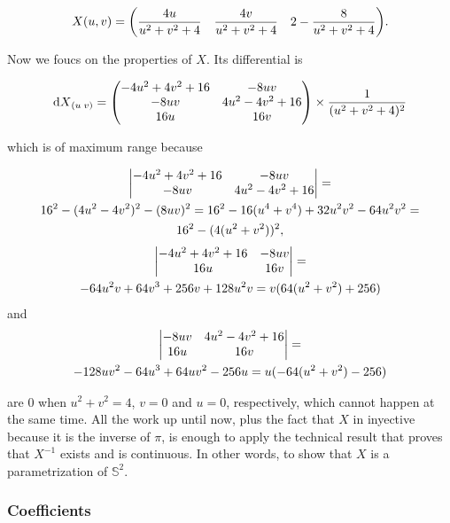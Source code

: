 \documentclass[
    12pt, %
]{fphw}
\newcommand{\sphere}{{\mathbb{S}^2}}
\begin{document}
\begin{equation*}
    X(u, v) =
    \mqty(\dfrac{4u}{u^2+v^2+4} & \dfrac{4v}{u^2+v^2+4} & 2-\dfrac{8}{u^2+v^2+4}).
\end{equation*}

    Now we foucs on the properties of $X$. Its differential is

\begin{equation*}
    \dd{X}_{(u \; v)} =
    \pmqty{
    -4u^2 + 4v^2 + 16 & -8uv \\
    -8uv & 4u^2 - 4v^2 + 16 \\
    16u & 16v \\
    } \times \frac{1}{(u^2+v^2+4)^2}
\end{equation*}

\noindent
which is of maximum range because

\begin{multline*}
    \mqty|
    -4u^2 + 4v^2 + 16 & -8uv \\
    -8uv & 4u^2 - 4v^2 + 16
    | = \\
    16^2 - (4u^2-4v^2)^2 - (8uv)^2 =
    16^2 - 16(u^4+v^4) + 32u^2v^2 - 64u^2v^2 = \\
    16^2 - (4(u^2+v^2))^2,
\end{multline*}
\begin{multline*}
    \mqty|
    -4u^2 + 4v^2 + 16 & -8uv \\
    16u & 16v \\
    | = \\
    -64u^2v + 64v^3 + 256v + 128u^2v =
    v(64(u^2 + v^2) + 256)
\end{multline*}
\noindent
and
\begin{multline*}
    \mqty|
    -8uv & 4u^2 - 4v^2 + 16 \\
    16u & 16v \\
    | = \\
    -128uv^2 - 64u^3 + 64uv^2 - 256u =
    u(-64(u^2 + v^2) - 256)
\end{multline*}

\noindent
are $0$ when $u^2+v^2 = 4$, $v = 0$ and $u = 0$, respectively,
which cannot happen at the same time.
All the work up until now,
plus the fact that $X$ in inyective because it is the inverse of $π$,
is enough to apply the technical result that proves that
$X^{-1}$ exists and is continuous.
In other words, to show that $X$ is a parametrization of $\sphere$.

\subsubsection*{Coefficients}
\end{document}
